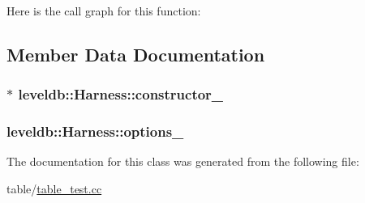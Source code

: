Here is the call graph for this function\-:




\subsection{Member Data Documentation}
\hypertarget{classleveldb_1_1_harness_a04b2410b1da9c47dd78240702e68c826}{
\subsubsection[{constructor\-\_\-}]{$\ast$ leveldb\-::\-Harness\-::constructor\-\_\-\hspace{0.3cm}{\ttfamily [private]}}}\label{classleveldb_1_1_harness_a04b2410b1da9c47dd78240702e68c826}
\hypertarget{classleveldb_1_1_harness_a503838bed7ecbdec2d06f577e54f522c}{
\subsubsection[{options\-\_\-}]{ leveldb\-::\-Harness\-::options\-\_\-\hspace{0.3cm}{\ttfamily [private]}}}\label{classleveldb_1_1_harness_a503838bed7ecbdec2d06f577e54f522c}


The documentation for this class was generated from the following file\-:\begin{DoxyCompactItemize}
\item 
table/\hyperlink{table__test_8cc}{table\-\_\-test.\-cc}\end{DoxyCompactItemize}
